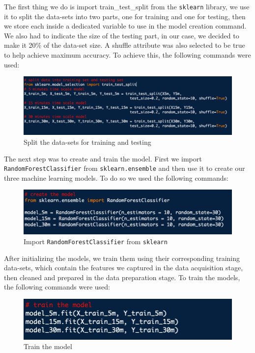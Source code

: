 \documentclass{article}
\begin{document}
The first thing we do is import train\_test\_split from the \texttt{sklearn} library, we use it to split the data-sets into two parts, one for training and one for testing, then we store each inside a dedicated variable to use in the model creation command. We also had to indicate the size of the testing part, in our case, we decided to make it 20\% of the data-set size. A shuffle attribute was also selected to be true to help achieve maximum accuracy. To achieve this, the following commands were used:\newline

\begin{figure}[!ht]
    \centering
    \includegraphics[width=13cm]{ML2graphs/splittraintest.png}
    \caption{Split the data-sets for training and testing} 
\end{figure}

The next step was to create and train the model. First we import \texttt{RandomForestClassifier} from \texttt{sklearn.ensemble} and then use it to create our three machine learning models. To do so we used the following commands:\newline

\begin{figure}[!ht]
    \centering
    \includegraphics[width=13cm]{ML2graphs/importrandomforest.png}
    \caption{Import \texttt{RandomForestClassifier} from \texttt{sklearn}} 
\end{figure}

After initializing the models, we train them using their corresponding training data-sets, which contain the features we captured in the data acquisition stage, then cleaned and prepared in the data preparation stage. To train the models, the following commands were used:\newline 

\begin{figure}[!ht]
    \centering
    \includegraphics[width=13cm]{ML2graphs/trainmodel.png}
    \caption{Train the model} 
\end{figure}
\end{document}
